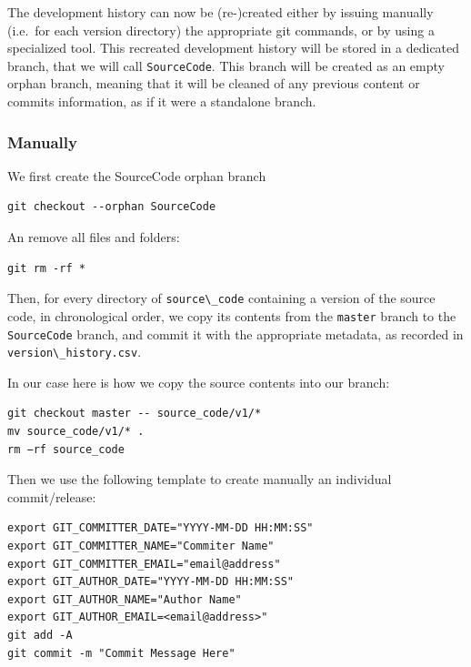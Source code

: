 \documentclass[]{article}
\newcommand{\passthrough}[1]{#1}
\begin{document}
The development history can now be (re-)created either by issuing
manually (i.e.~for each version directory) the appropriate git commands,
or by using a specialized tool. This recreated development history will
be stored in a dedicated branch, that we will call
\passthrough{\lstinline!SourceCode!}. This branch will be created as an
empty orphan branch, meaning that it will be cleaned of any previous
content or commits information, as if it were a standalone branch.

\hypertarget{manually}{%
\subsubsection{Manually}\label{manually}}

We first create the SourceCode orphan branch

\begin{lstlisting}
git checkout --orphan SourceCode
\end{lstlisting}

An remove all files and folders:

\begin{lstlisting}
git rm -rf *
\end{lstlisting}

Then, for every directory of \passthrough{\lstinline!source\_code!}
containing a version of the source code, in chronological order, we copy
its contents from the \passthrough{\lstinline!master!} branch to the
\passthrough{\lstinline!SourceCode!} branch, and commit it with the
appropriate metadata, as recorded in
\passthrough{\lstinline!version\_history.csv!}.

In our case here is how we copy the source contents into our branch:

\begin{lstlisting}
git checkout master -- source_code/v1/*
mv source_code/v1/* .
rm −rf source_code
\end{lstlisting}

Then we use the following template to create manually an individual
commit/release:

\begin{lstlisting}
export GIT_COMMITTER_DATE="YYYY-MM-DD HH:MM:SS"
export GIT_COMMITTER_NAME="Commiter Name"
export GIT_COMMITTER_EMAIL="email@address"
export GIT_AUTHOR_DATE="YYYY-MM-DD HH:MM:SS"
export GIT_AUTHOR_NAME="Author Name"
export GIT_AUTHOR_EMAIL=<email@address>"
git add -A
git commit -m "Commit Message Here"
\end{lstlisting}
\end{document}
